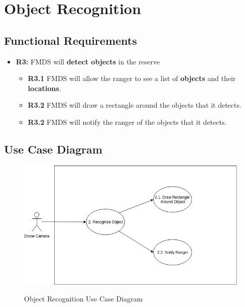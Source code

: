 \section{ Object Recognition }
\subsection{Functional Requirements}
	\begin{flushleft}
		\begin{itemize}
			\item{\textbf{R3:}} FMDS will \textbf{detect objects} in the reserve
				\begin{itemize}
					\item{\textbf{R3.1}} FMDS will allow the ranger to see a list of \textbf{objects} and their \textbf{locations}.
					\item{\textbf{R3.2}} FMDS will draw a rectangle around the objects that it detects.
					\item{\textbf{R3.2}} FMDS will notify the ranger of the objects that it detects.
				\end{itemize}
		\end{itemize}
	\end{flushleft}

\subsection{Use Case Diagram}
\begin{flushleft}
	\begin{figure}[h!]
		\centering
		\includegraphics[scale=0.5]{./assets/images/object-recognition-ucd.jpg}
		\label{fig: object-recognition-ucd }
		\caption{Object Recognition Use Case Diagram}
	\end{figure}

\end{flushleft}

